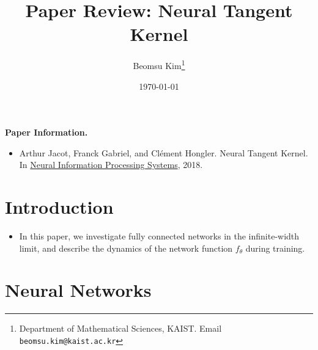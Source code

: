 \documentclass[10pt]{article}
\title{Paper Review: Neural Tangent Kernel}
\author{Beomsu Kim\footnote{Department of Mathematical Sciences, KAIST. Email \texttt{beomsu.kim@kaist.ac.kr}}}
\date{\today}
\begin{document}
\maketitle

\textbf{Paper Information.}

\begin{itemize}
\item Arthur Jacot, Franck Gabriel, and Cl\'{e}ment Hongler. Neural Tangent Kernel. \newline In \underline{Neural Information Processing Systems}, 2018.
\end{itemize}

\section{Introduction}

\begin{itemize}
\item In this paper, we investigate fully connected networks in the infinite-width limit, and describe the dynamics of the network function $f_\theta$ during training.
\end{itemize}

\section{Neural Networks}
\end{document}
